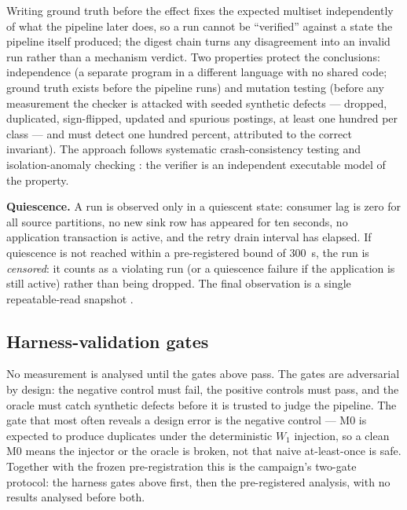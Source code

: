 Writing ground truth before the effect fixes the expected multiset independently of what the
pipeline later does, so a run cannot be ``verified'' against a state the pipeline itself
produced; the digest chain turns any disagreement into an invalid run rather than a mechanism
verdict. Two properties protect the conclusions: independence (a separate program in a different
language with no shared code; ground truth exists before the pipeline runs) and mutation testing
(before any measurement the checker is attacked with seeded synthetic defects --- dropped,
duplicated, sign-flipped, updated and spurious postings, at least one hundred per class --- and
must detect one hundred percent, attributed to the correct invariant). The approach follows
systematic crash-consistency testing \cite{crashmonkey2019} and isolation-anomaly checking
\cite{elle2020}: the verifier is an independent executable model of the property.

\textbf{Quiescence.} A run is observed only in a quiescent state: consumer lag is zero for all
source partitions, no new sink row has appeared for ten seconds, no application transaction is
active, and the retry drain interval has elapsed. If quiescence is not reached within a
pre-registered bound of 300~s, the run is \emph{censored}: it counts as a violating run (or a
quiescence failure if the application is still active) rather than being dropped. The final
observation is a single repeatable-read snapshot \cite{pg-isolation}.

\subsection{Harness-validation gates}
\label{sec:method:gates}

No measurement is analysed until the gates above pass. The gates are
adversarial by design: the negative control must fail, the positive controls must pass, and the
oracle must catch synthetic defects before it is trusted to judge the pipeline. The gate that most
often reveals a design error is the negative control --- M0 is expected to produce duplicates
under the deterministic $W_1$ injection, so a clean M0 means the injector or the oracle is
broken, not that naive at-least-once is safe. Together with the frozen pre-registration this is
the campaign's two-gate protocol: the harness gates above first, then the pre-registered analysis, with no results analysed before both.

